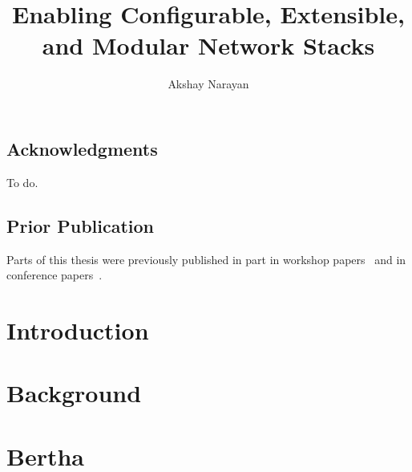 \documentclass[fontsize=12pt,paper=letter,twosided,cleardoublepage=plain,final]{scrbook}
\title{Enabling Configurable, Extensible, and Modular Network Stacks}
\author{Akshay Narayan}
\begin{document}
\frontmatter



\cleardoublepage


\cleardoublepage

\section*{Acknowledgments}
\begin{spacing}{1}
%
    To do.
\end{spacing}
\cleardoublepage

\section*{Prior Publication}
Parts of this thesis were previously published in part in workshop papers~\cite{ccp, bertha} and in conference
papers~\cite{ccp, bundler, park}.
\cleardoublepage

\tableofcontents

\mainmatter

\chapter{Introduction}\label{s:intro}



\chapter{Background}\label{s:background}


\chapter{Bertha}\label{s:bertha}







\end{document}
